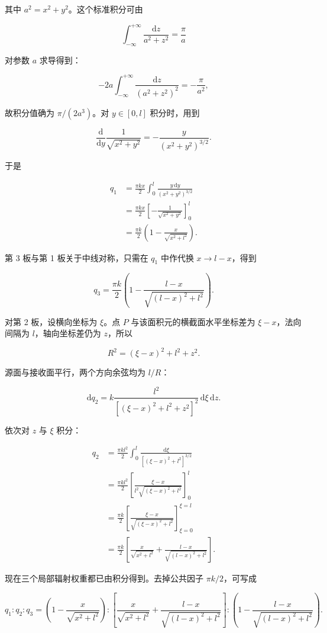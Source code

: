 \documentclass[12pt,a4paper,UTF8]{ctexart}
\begin{document}
其中 \(a^2=x^2+y^2\)。这个标准积分可由

\[\int_{-\infty}^{+\infty}\frac{\mathrm dz}{a^2+z^2}=\frac\pi a\]

对参数 \(a\) 求导得到：

\[-2a\int_{-\infty}^{+\infty}
\frac{\mathrm dz}{(a^2+z^2)^2}
=-\frac\pi{a^2},\]

故积分值确为 \(\pi/(2a^3)\)。对 \(y\in[0,l]\) 积分时，用到

\[\frac{\mathrm d}{\mathrm dy}
\frac1{\sqrt{x^2+y^2}}
=-\frac{y}{(x^2+y^2)^{3/2}}.\]

于是

\[\begin{aligned}
q_1
&=\frac{\pi kx}{2}
\int_0^l\frac{y\,\mathrm dy}{(x^2+y^2)^{3/2}}\\
&=\frac{\pi kx}{2}
\left[-\frac1{\sqrt{x^2+y^2}}\right]_{0}^{l}\\
&=\frac{\pi k}{2}
\left(1-\frac{x}{\sqrt{x^2+l^2}}\right).
\end{aligned}\]

第 3 板与第 1 板关于中线对称，只需在 \(q_1\) 中作代换 \(x\to l-x\)，得到

\[q_3=\frac{\pi k}{2}
\left(1-\frac{l-x}{\sqrt{(l-x)^2+l^2}}\right).\]

对第 2 板，设横向坐标为 \(\xi\)。点 \(P\) 与该面积元的横截面水平坐标差为
\(\xi-x\)，法向间隔为 \(l\)，轴向坐标差仍为 \(z\)，所以

\[R^2=(\xi-x)^2+l^2+z^2.\]

源面与接收面平行，两个方向余弦均为 \(l/R\)：

\[\mathrm dq_2
=k\frac{l^2}{[(\xi-x)^2+l^2+z^2]^2}\,\mathrm d\xi\,\mathrm dz.\]

依次对 \(z\) 与 \(\xi\) 积分：

\[\begin{aligned}
q_2
&=\frac{\pi kl^2}{2}
\int_0^l
\frac{\mathrm d\xi}{[(\xi-x)^2+l^2]^{3/2}}\\
&=\frac{\pi kl^2}{2}
\left[
\frac{\xi-x}{l^2\sqrt{(\xi-x)^2+l^2}}
\right]_{0}^{l}\\
&=\frac{\pi k}{2}
\left[
\frac{\xi-x}{\sqrt{(\xi-x)^2+l^2}}
\right]_{\xi=0}^{\xi=l}\\
&=\frac{\pi k}{2}\left[
\frac{x}{\sqrt{x^2+l^2}}
+\frac{l-x}{\sqrt{(l-x)^2+l^2}}
\right].
\end{aligned}\]

现在三个局部辐射权重都已由积分得到。去掉公共因子 \(\pi k/2\)，可写成

\[\boxed{
q_1:q_2:q_3=
\left(1-\frac{x}{\sqrt{x^2+l^2}}\right):
\left[
\frac{x}{\sqrt{x^2+l^2}}
+\frac{l-x}{\sqrt{(l-x)^2+l^2}}
\right]:
\left(1-\frac{l-x}{\sqrt{(l-x)^2+l^2}}\right)
}.\]
\end{document}
